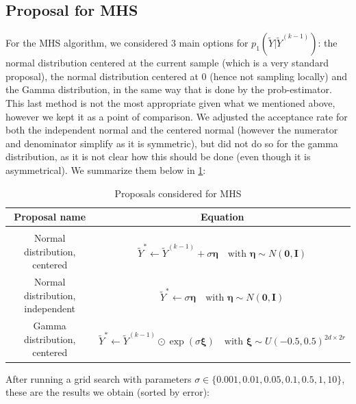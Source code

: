 \documentclass[12pt]{memoir}
\newcommand{\mb}{\mathbf}
\begin{document}
\subsection*{Proposal for MHS}
For the MHS algorithm, we considered 3 main options for $p_1(\tilde Y| \tilde Y ^{(k-1)})$: the normal distribution centered at the current sample (which is a very standard proposal), the normal distribution centered at 0 (hence not sampling locally) and the Gamma distribution, in the same way that is done by the prob-estimator. This last method is not the most appropriate given what we mentioned above, however we kept it as a point of comparison. We adjusted the acceptance rate for both the independent normal and the centered normal (however the numerator and denominator simplify as it is symmetric), but did not do so for the gamma distribution, as it is not clear how this should be done (even though it is asymmetrical). We summarize them below in \ref{table:proposal-comp-mhs}:
\begin{table}[H]

    \begin{center}
        \begin{tabular}{|c|c|}
            \hline
            Proposal name & Equation\\
            \hline\hline
             & \\[-10pt]
            Normal distribution, centered & $\tilde Y^* \gets \tilde Y^{(k-1)} + \sigma \boldsymbol{\eta} \quad\text{with } \boldsymbol{\eta} \sim N(\mb 0, \mb I)$\\
            Normal distribution, independent & $\tilde Y^* \gets \sigma \boldsymbol{\eta} \quad\text{with } \boldsymbol{\eta} \sim N(\mb 0, \mb I)$\\
            Gamma distribution, centered & $\tilde Y^* \gets \tilde Y^{(k-1)} \odot \exp (\sigma\boldsymbol{\xi})\quad \text{with } \boldsymbol{\xi} \sim U(-0.5, 0.5)^{2d\times 2r}$\\\hline
        \end{tabular}
\end{center}
\caption{Proposals considered for MHS}
\label{table:proposal-comp-mhs}
\end{table}

After running a grid search with parameters $\sigma\in \{0.001, 0.01, 0.05, 0.1, 0.5, 1, 10\}$, these are the results we obtain (sorted by error): 
\end{document}
